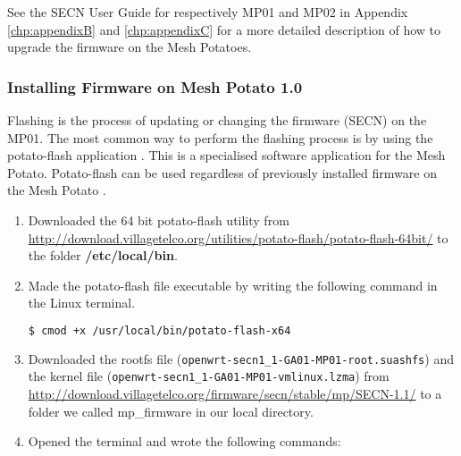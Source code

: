 See the SECN User Guide for respectively MP01 and MP02 in Appendix \ref{chp:appendixB} and \ref{chp:appendixC} for a more detailed description of how to upgrade the firmware on the Mesh Potatoes.

\subsubsection{Installing Firmware on Mesh Potato 1.0}
Flashing is the process of updating or changing the firmware (SECN) on the MP01. The most common way to perform the flashing process is by using the potato-flash application \cite{flashing}. This is a specialised software application for the Mesh Potato. Potato-flash can be used regardless of previously installed firmware on the Mesh Potato \cite{InstallingSecnFirmware}. 

\begin{enumerate}
\item Downloaded the 64 bit potato-flash utility from \url{http://download.villagetelco.org/utilities/potato-flash/potato-flash-64bit/} to the folder \textbf{/etc/local/bin}.
\item Made the potato-flash file executable by writing the following command in the Linux terminal.
\begin{lstlisting}[language=bash]
  $ cmod +x /usr/local/bin/potato-flash-x64
\end{lstlisting}
\item Downloaded the rootfs file (\texttt{openwrt-secn1_1-GA01-MP01-root.suashfs}) and the kernel file (\texttt{openwrt-secn1_1-GA01-MP01-vmlinux.lzma})  from \url{http://download.villagetelco.org/firmware/secn/stable/mp/SECN-1.1/} to a folder we called mp\_firmware in our local directory.
\item Opened the terminal and wrote the following commands: 
\end{enumerate}



